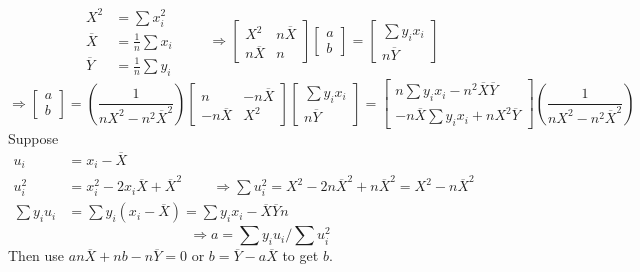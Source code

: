 \documentclass[twoside]{amsart}
\theoremstyle{plain}
\theoremstyle{definition}
\begin{document}
\[
\begin{aligned}
  X^2 & = \sum x_i^2 \\ 
  \overline{X} & = \frac{1}{n} \sum x_i \\ 
  \overline{Y} & = \frac{1}{n} \sum y_i
\end{aligned} \quad \quad \, \Longrightarrow \left[ \begin{matrix} X^2 & n \overline{X} \\ n \overline{X} & n \end{matrix} \right] \left[ \begin{matrix} a \\ b \end{matrix} \right] = \left[ \begin{matrix} \sum y_i x_i \\ n \overline{Y} \end{matrix} \right]
\]
\[
\Longrightarrow \left[ \begin{matrix} a \\ b \end{matrix} \right] = \left( \frac{1}{ nX^2 - n^2 \overline{X}^2 } \right) \left[ \begin{matrix} n & - n\overline{X} \\ -n \overline{X} & X^2 \end{matrix} \right] \left[ \begin{matrix} \sum y_i x_i \\ n \overline{Y} \end{matrix} \right] = \left[ \begin{matrix} n \sum y_i x _i - n^2 \overline{X} \overline{Y} \\ -n \overline{X} \sum y_i x_i + n X^2 \overline{Y} \end{matrix} \right] \left( \frac{1}{ nX^2 - n^2 \overline{X}^2 } \right)
\]
Suppose $ \begin{aligned} 
  u_i & = x_i - \overline{X} \\ 
  u_i^2 & = x_i^2 - 2x_i \overline{X} + \overline{X}^2 \quad \quad \, \Longrightarrow \sum u_i^2 = X^2 - 2n\overline{X}^2 + n\overline{X}^2 = X^2 - n\overline{X}^2 \\ 
  \sum y_i u_i & = \sum y_i (x_i - \overline{X} ) = \sum y_i x_i - \overline{X} \overline{Y} n 
\end{aligned}$
\[
\Longrightarrow a = \sum y_i u_i / \sum u_i^2 
\]
Then use $an\overline{X} + nb - n\overline{Y} = 0$ or $b = \overline{Y} -a\overline{X}$ to get $b$.  
\end{document}
